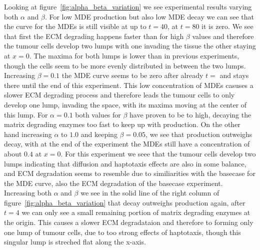 Looking at figure~\ref{fig:alpha_beta_variation} we see experimental results varying both $\alpha$ and $\beta$. For low MDE production but also low MDE decay we can see that the curve for the MDEs is still visible at up to $t=40$, at $t=80$ it is zero. We see that first the ECM degrading happens faster than for high $\beta$ values and therefore the tumour cells develop two lumps with one invading the tissue the other staying at $x=0$. The maxima for both lumps is lower than in previous experiments, though the cells seem to be more evenly distributed in between the two lumps. Increasing $\beta=0.1$ the MDE curve seems to be zero after already $t=$ and stays there until the end of this experiment. This low concentration of MDEs casuses a slower ECM degrading process and therefore leads the tumour cells to only develop one lump, invading the space, with its maxima moving at the center of this lump. For $\alpha=0.1$ both values for $\beta$ have proven to be to high, decaying the matrix degrading enzymes too fast to keep up with production.
On the other hand increasing $\alpha$ to $1.0$ and keeping $\beta=0.05$, we see that production outweighs decay, with at the end of the experiment the MDEs still have a concentration of about $0.4$ at $x=0$. For this experiment we seee that the tumour cells develop two lumps indicating that diffusion and haptotaxis effects are also in some balance, and ECM degradation seems to resemble due to similiarities with the basecase for the MDE curve, also the ECM degradation of the basecase experiment.
Increasing both $\alpha$ and $\beta$ we see in the solid line of the right column of figure~\ref{fig:alpha_beta_variation} that decay outweighs production again, after $t=4$ we can only see a small remaining portion of matrix degrading enzymes at the origin. This causes a slower ECM degradataion and therefore to forming only one lump of tumour cells, due to too strong effects of haptotaxis, though this singular lump is streched flat along the x-axis.

